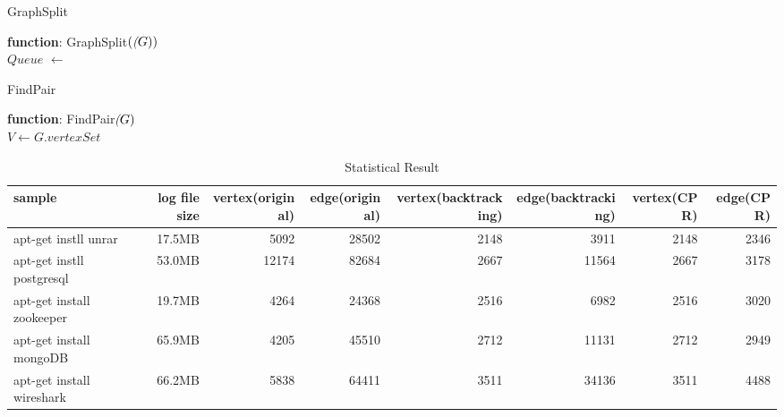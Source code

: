 \begin{algorithm}[t]
	\caption{GraphSplit}
	\textbf{function}: GraphSplit$(\textit(G))$\\
	$Queue$ $\leftarrow$ \;
	\;	
	\label{alg:split}
\end{algorithm}

\begin{algorithm}[!htbp]
	\caption{FindPair}
	\textbf{function}: FindPair$\textit(G)$\\
	$V \leftarrow G.vertexSet$\;
	\label{alg:find}
\end{algorithm}



\begin{table}[!hp]
	\centering
	\caption{Statistical Result}
	\label{my-label}
	\begin{scriptsize}
		\begin{tabular}{|l|r|r|r|r|r|r|r|}
			\hline
			sample                    & log file size & vertex(original) & edge(original) & vertex(backtracking) & edge(backtracking) & vertex(CPR) & edge(CPR) \\ \hline
			apt-get instll unrar      & 17.5MB        & 5092             & 28502          & 2148                 & 3911               & 2148        & 2346      \\ \hline
			apt-get instll postgresql & 53.0MB        & 12174            & 82684          & 2667                 & 11564              & 2667        & 3178      \\ \hline
			apt-get install zookeeper & 19.7MB        & 4264             & 24368          & 2516                 & 6982               & 2516        & 3020      \\ \hline
			apt-get install mongoDB   & 65.9MB        & 4205             & 45510          & 2712                 & 11131              & 2712        & 2949      \\ \hline
			apt-get install wireshark & 66.2MB        & 5838             & 64411          & 3511                 & 34136              & 3511        & 4488      \\ \hline
		\end{tabular}%
	\end{scriptsize}
	
\end{table}

